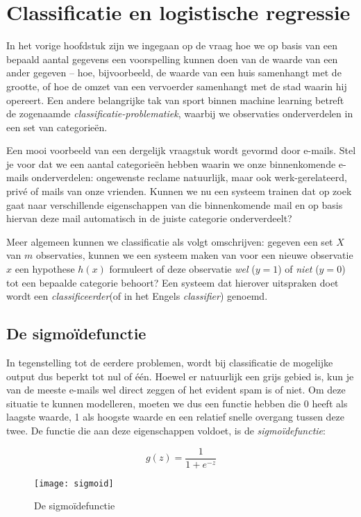 
\section{Classificatie en logistische regressie}

In het vorige hoofdstuk zijn we ingegaan op de vraag hoe we op basis van een bepaald aantal gegevens een voorspelling kunnen doen van de waarde van een ander gegeven – hoe, bijvoorbeeld, de waarde van een huis samenhangt met de grootte, of hoe de omzet van een vervoerder samenhangt met de stad waarin hij opereert. Een andere belangrijke tak van sport binnen machine learning betreft de zogenaamde \textit{classificatie-problematiek}, waarbij we observaties onderverdelen in een set van categorieën.

Een mooi voorbeeld van een dergelijk vraagstuk wordt gevormd door e-mails. Stel je voor dat we een aantal categorieën hebben waarin we onze binnenkomende e-mails onderverdelen: ongewenste reclame natuurlijk, maar ook werk-gerelateerd, privé of mails van onze vrienden. Kunnen we nu een systeem trainen dat op zoek gaat naar verschillende eigenschappen van die binnenkomende mail en op basis hiervan deze mail automatisch in de juiste categorie onderverdeelt? 

Meer algemeen kunnen we classificatie als volgt omschrijven: gegeven een set $X$ van $m$ observaties, kunnen we een systeem maken van voor een nieuwe observatie $x$ een hypothese $h(x)$ formuleert of deze observatie \textit{wel} ($y=1$) of \textit{niet} ($y=0$) tot een bepaalde categorie behoort? Een systeem dat hierover uitspraken doet wordt een \textit{classificeerder}(of in het Engels \textit{classifier}) genoemd.


\subsection{De sigmoïdefunctie}

In tegenstelling tot de eerdere problemen, wordt bij classificatie de mogelijke output dus beperkt tot nul of één. Hoewel er natuurlijk een grijs gebied is, kun je van de meeste e-mails wel direct zeggen of het evident spam is of niet. Om deze situatie te kunnen modelleren, moeten we dus een functie hebben die 0 heeft als laagste waarde, 1 als hoogste waarde en een relatief snelle overgang tussen deze twee. De functie die aan deze eigenschappen voldoet, is de \textit{sigmoïdefunctie}:

\[
g(z) = \frac{1}{1+e^{-z}}
\]

\begin{figure}[h]
\centering
\texttt{[image: sigmoid]}
\caption{De sigmoïdefunctie\label{img:sigmoid}}
\end{figure}

